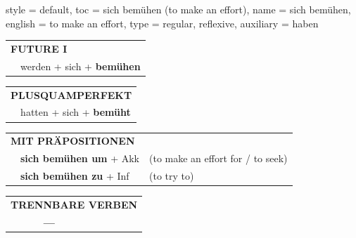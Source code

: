 \begin{verbentry}{
  style = {default},
  toc = {sich bemühen (to make an effort)},
  name = {sich bemühen},
  english = {to make an effort},
  type = {regular, reflexive},
  auxiliary = {haben}
}
\begin{tabular}{rl}
    \multicolumn{2}{l}{\textbf{FUTURE I} }\\
   & werden + sich + \textbf{bemühen}\\
 
  \end{tabular}
\hfill
   \begin{tabular}{rl}
      \multicolumn{2}{l}{\textbf{PLUSQUAMPERFEKT}}\\
   & hatten + sich + \textbf{bemüht}\\
  \end{tabular}

   \vspace{10pt}

   \begin{tabular}{lll}
      \multicolumn{3}{l}{\textbf{MIT PRÄPOSITIONEN}}\\
& \textbf{sich bemühen um} + Akk & (to make an effort for / to seek)\\
& \textbf{sich bemühen zu} + Inf & (to try to)\\
\end{tabular}
  \hfill
   \begin{tabular}{lll}
\multicolumn{3}{l}{\textbf{TRENNBARE VERBEN}}\\
& \textbf{---} & \\
\end{tabular}


  \vspace{-5pt}
\end{verbentry}

